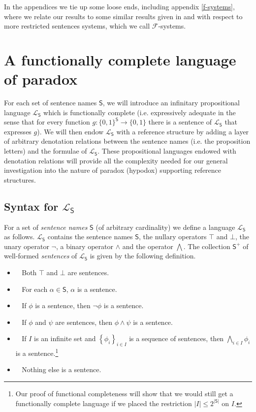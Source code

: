 \documentclass[12pt]{kluwer}
\theoremstyle{remark}
\newcommand{\prg}{\hspace{0.25in}}
\newcommand{\fancy}[1]{\mathcal{#1}}
\def\S{\textsf{S}}
\def\L{\fancy{L}}
\def\F{\fancy{F}}
\def\F{\fancy{F}}
\newcommand{\set}[1]{\left\{ #1 \right\}}
\newcommand{\card}[1]{\left|#1\right|}
\begin{document}
\prg In the appendices we tie up some loose ends, including appendix \ref{f-systems}, where we relate our results to some similar results given in \cite{cook} and \cite{yablo06} with respect to more restricted sentences systems, which we call $\F$-systems.

\section{A functionally complete language of paradox}
\label{sec1}

For each set of sentence names $\S$, we will introduce an infinitary propositional language $\L_\S$ which is functionally complete (i.e. expressively adequate in the sense that for every function $g: \{0,1\}^{\S} \rightarrow \{0,1\}$ there is a sentence of $\L_\S$ that expresses $g$). We will then endow $\L_\S$ with a reference structure by adding a layer of arbitrary denotation relations between the sentence names (i.e. the proposition letters) and the formulae of $\L_\S$. These propositional languages endowed with denotation relations will provide all the complexity needed for our general investigation into the nature of paradox (hypodox) supporting reference structures.

\subsection{Syntax for $\L_\S$}

\noindent For a set of \textit{sentence names} $\S$ (of arbitrary cardinality) we define a language $\L_\S$ as follows. $\L_\S$ contains the sentence names $\S$, the nullary operators $\top$ and $\bot$, the unary operator $\neg$, a binary operator $\wedge$ and the operator $\bigwedge$.  The collection $\S^{+}$ of well-formed \textit{sentences} of $\L_\S$ is given by the following definition.

\begin{itemize}
\item $\;\;$ Both $\top$ and $\bot$ are sentences. 
\item $\;\;$ For each $\alpha \in \S$, $\alpha$ is a sentence.
\item $\;\;$ If $\phi$ is a sentence, then $\neg \phi$ is a sentence.
\item $\;\;$ If $\phi$ and $\psi$ are sentences, then $\phi \wedge \psi$ is a sentence.
\item $\;\;$ If $I$ is an infinite set and $\set{\phi_i}_{i \in I}$ is a sequence of sentences, then $\bigwedge_{i \in I} \phi_i$ is a sentence.\footnote{Our proof of functional completeness will show that we would still get a functionally complete language if we placed the restriction $\card{I} \leq 2^{\card{\S}}$ on $I$.}
\item $\;\;$ Nothing else is a sentence.
\end{itemize}
\end{document}
